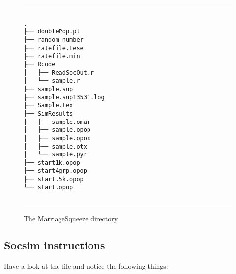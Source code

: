 \begin{figure}[h]
\vspace{.25cm}
\rule{.5\textwidth}{0.1mm}
  \centering
\begin{verbatim}

.
├── doublePop.pl
├── random_number
├── ratefile.Lese
├── ratefile.min
├── Rcode
│   ├── ReadSocOut.r
│   └── sample.r
├── sample.sup
├── sample.sup13531.log
├── Sample.tex
├── SimResults
│   ├── sample.omar
│   ├── sample.opop
│   ├── sample.opox
│   ├── sample.otx
│   └── sample.pyr
├── start1k.opop
├── start4grp.opop
├── start.5k.opop
└── start.opop


\end{verbatim}

  \caption{The MarriageSqueeze directory}
  \label{fig:Dir}
\rule{.5\textwidth}{0.1mm}
\end{figure}

\subsection{Socsim instructions}

Have a look at the  file and notice the following
things: 

